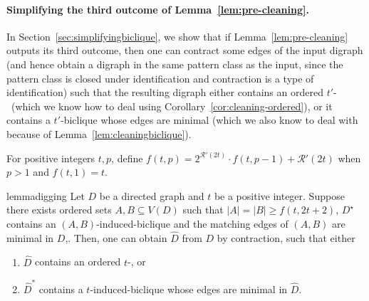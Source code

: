 \paragraph*{Simplifying the third outcome of Lemma~\ref{lem:pre-cleaning}.} In Section~\ref{sec:simplifyingbiclique}, we show that if Lemma~\ref{lem:pre-cleaning} outputs its third outcome, then one can contract some edges of the input digraph (and hence obtain a digraph in the same pattern class as the input, since the pattern class is closed under identification and contraction is a type of identification) such that the resulting digraph either contains an ordered $t'$-\toughpair\ (which we know how to deal using Corollary~\ref{cor:cleaning-ordered}), or it contains a $t'$-biclique whose edges are minimal (which we also know to deal with because of Lemma~\ref{lem:cleaningbiclique}).

For positive integers $t,p$, define $f(t,p) = 2^{\mathcal{R}'(2t)} \cdot f(t,p-1) + \mathcal{R}'(2t)$ when $p >1$ and $f(t,1)=t$.

\begin{restatable}{lemma}{digging}\label{lem:digging}
Let $D$ be a directed graph and $t$ be a positive integer.  
Suppose there exists ordered sets
$A,B \subseteq V(D)$ such that $|A|=|B|\geq f(t,2t+2)$, 
$D^{\star}$ contains an $(A,B)$-induced-biclique and the matching edges of $(A,B)$ are minimal in $D$,.
Then, one can obtain $\widehat{D}$ from $D$ by contraction, such that 
either
\begin{enumerate}
\item $\widehat{D}$ contains an ordered $t$-\toughpair, or
\item $\widehat{D}^*$ contains a $t$-induced-biclique whose edges are minimal in $\widehat{D}$.
\end{enumerate}
\end{restatable}

